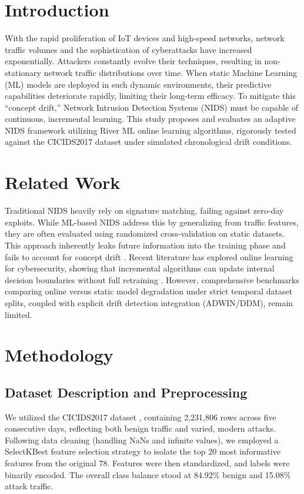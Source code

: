\documentclass{ieeeaccess}
\begin{document}
\section{Introduction}
\label{sec:introduction}
With the rapid proliferation of IoT devices and high-speed networks, network traffic volumes and the sophistication of cyberattacks have increased exponentially. Attackers constantly evolve their techniques, resulting in non-stationary network traffic distributions over time. When static Machine Learning (ML) models are deployed in such dynamic environments, their predictive capabilities deteriorate rapidly, limiting their long-term efficacy. To mitigate this ``concept drift,'' Network Intrusion Detection Systems (NIDS) must be capable of continuous, incremental learning. This study proposes and evaluates an adaptive NIDS framework utilizing River ML online learning algorithms, rigorously tested against the CICIDS2017 dataset under simulated chronological drift conditions.

\section{Related Work}
Traditional NIDS heavily rely on signature matching, failing against zero-day exploits. While ML-based NIDS address this by generalizing from traffic features, they are often evaluated using randomized cross-validation on static datasets. This approach inherently leaks future information into the training phase and fails to account for concept drift \cite{sharafaldin2018toward, aldweesh2020deep}. Recent literature has explored online learning for cybersecurity, showing that incremental algorithms can update internal decision boundaries without full retraining \cite{gomes2017adaptive}. However, comprehensive benchmarks comparing online versus static model degradation under strict temporal dataset splits, coupled with explicit drift detection integration (ADWIN/DDM), remain limited.

\section{Methodology}
\subsection{Dataset Description and Preprocessing}
We utilized the CICIDS2017 dataset \cite{sharafaldin2018toward}, containing 2,231,806 rows across five consecutive days, reflecting both benign traffic and varied, modern attacks. Following data cleaning (handling NaNs and infinite values), we employed a SelectKBest feature selection strategy to isolate the top 20 most informative features from the original 78. Features were then standardized, and labels were binarily encoded. The overall class balance stood at 84.92\% benign and 15.08\% attack traffic.
\end{document}
